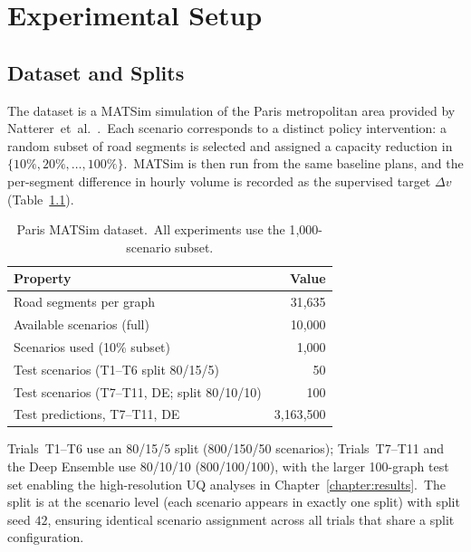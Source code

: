 
\chapter{Experimental Setup}\label{chapter:experiments}

\section{Dataset and Splits}\label{sec:dataset}

The dataset is a MATSim simulation of the Paris metropolitan area provided by Natterer~et~al.~\cite{natterer2025ml}.\ Each scenario corresponds to a distinct policy intervention: a random subset of road segments is selected and assigned a capacity reduction in $\{10\%, 20\%, \dots, 100\%\}$.\ MATSim is then run from the same baseline plans, and the per-segment difference in hourly volume is recorded as the supervised target $\Delta v$ (Table~\ref{tab:dataset}).

\begin{table}[htbp]
 \centering
 \caption[Paris MATSim dataset statistics]{Paris MATSim dataset.\ All experiments use the 1{,}000-scenario subset.}
 \label{tab:dataset}
 \begin{tabular}{lr}
 \toprule
 Property & Value \\
 \midrule
 Road segments per graph & 31{,}635 \\
 Available scenarios (full) & 10{,}000 \\
 Scenarios used (10\% subset) & 1{,}000 \\
 Test scenarios (T1--T6 split 80/15/5) & 50 \\
 Test scenarios (T7--T11, DE; split 80/10/10) & 100 \\
 Test predictions, T7--T11, DE & 3{,}163{,}500 \\
 \bottomrule
 \end{tabular}
\end{table}

Trials~T1--T6 use an 80/15/5 split (800/150/50 scenarios); Trials~T7--T11 and the Deep Ensemble use 80/10/10 (800/100/100), with the larger 100-graph test set enabling the high-resolution UQ analyses in Chapter~\ref{chapter:results}.\ The split is at the scenario level (each scenario appears in exactly one split) with split seed $42$, ensuring identical scenario assignment across all trials that share a split configuration.

